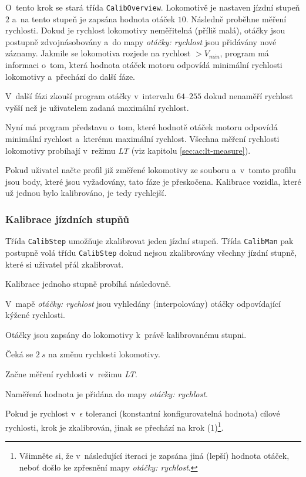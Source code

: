 O~tento krok se stará třída \texttt{CalibOverview}.
Lokomotivě je nastaven jízdní stupeň $2$ a~na tento stupeň je zapsána hodnota otáček
$10$. Následně proběhne měření rychlosti. Dokud je rychlost lokomotivy
neměřitelná (příliš malá), otáčky jsou postupně zdvojnásobovány a~do mapy
\textit{otáčky: rychlost} jsou přidávány nové záznamy. Jakmile se lokomotiva
rozjede na rychlost $> V_{min}$, program má informaci o~tom, která hodnota
otáček motoru odpovídá minimální rychlosti lokomotivy a~přechází do další fáze.

V~další fázi zkouší program otáčky v~intervalu $64$--$255$ dokud nenaměří
rychlost vyšší než je uživatelem zadaná maximální rychlost.

Nyní má program představu o~tom, které hodnotě otáček motoru odpovídá minimální
rychlost a~kterému maximální rychlost. Všechna měření rychlosti lokomotivy
probíhají v~režimu \textit{LT} (viz kapitolu \ref{sec:ac:lt-measure}).

Pokud uživatel načte profil již změřené lokomotivy ze souboru a~v~tom\-to profilu
jsou body, které jsou vyžadovány, tato fáze je přeskočena. Kalibrace vozidla,
které už jednou bylo kalibrováno, je tedy rychlejší.

\subsubsection{Kalibrace jízdních stupňů}

Třída \texttt{CalibStep} umožňuje zkalibrovat jeden jízdní stupeň. Třída
\texttt{CalibMan} pak postupně volá třídu \texttt{CalibStep} dokud nejsou
zkalibrovány všechny jízdní stupně, které si uživatel přál zkalibrovat.

Kalibrace jednoho stupně probíhá následovně.

\begin{compactenum}
\item V~mapě \textit{otáčky: rychlost} jsou vyhledány (interpolovány) otáčky odpovídající
      kýžené rychlosti.
\item Otáčky jsou zapsány do lokomotivy k~právě kalibrovanému stup\-ni.
\item Čeká se $2\ s$ na změnu rychlosti lokomotivy.
\item Začne měření rychlosti v~režimu \textit{LT}.
\item Naměřená hodnota je přidána do mapy \textit{otáčky: rychlost}.
\item Pokud je rychlost v~$\epsilon$ toleranci (konstantní konfigurovatelná hodnota)
      cílové rychlosti, krok je zkalibrován, jinak se přechází na krok
      (1)\footnote{Všimněte si, že v~následující iteraci je zapsána jiná (lepší)
      hodnota otáček, neboť došlo ke zpřesnění mapy \textit{otáčky: rychlost}.}.
\end{compactenum}

